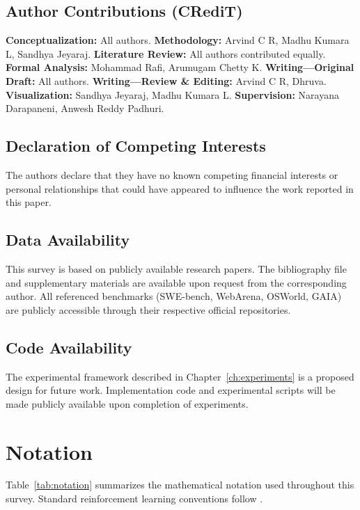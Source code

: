 \documentclass[12pt,a4paper]{report}
\theoremstyle{definition}
\begin{document}
\section*{Author Contributions (CRediT)}
\noindent\textbf{Conceptualization:} All authors. \textbf{Methodology:} Arvind C R, Madhu Kumara L, Sandhya Jeyaraj. \textbf{Literature Review:} All authors contributed equally. \textbf{Formal Analysis:} Mohammad Rafi, Arumugam Chetty K. \textbf{Writing---Original Draft:} All authors. \textbf{Writing---Review \& Editing:} Arvind C R, Dhruva. \textbf{Visualization:} Sandhya Jeyaraj, Madhu Kumara L. \textbf{Supervision:} Narayana Darapaneni, Anwesh Reddy Padhuri.

\section*{Declaration of Competing Interests}
The authors declare that they have no known competing financial interests or personal relationships that could have appeared to influence the work reported in this paper.

\section*{Data Availability}
This survey is based on publicly available research papers. The bibliography file and supplementary materials are available upon request from the corresponding author. All referenced benchmarks (SWE-bench, WebArena, OSWorld, GAIA) are publicly accessible through their respective official repositories.

\section*{Code Availability}
The experimental framework described in Chapter~\ref{ch:experiments} is a proposed design for future work. Implementation code and experimental scripts will be made publicly available upon completion of experiments.

\appendix



\chapter*{Notation}
\label{ch:notation}

\noindent Table~\ref{tab:notation} summarizes the mathematical notation used throughout this survey. Standard reinforcement learning conventions follow \cite{sutton2018reinforcement}.
\end{document}
